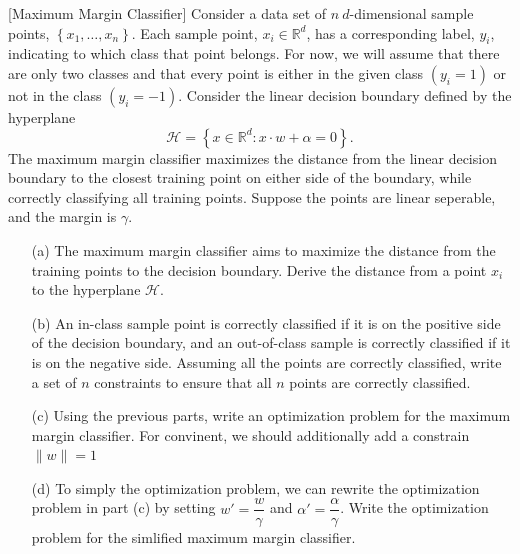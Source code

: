 \item {} [Maximum Margin Classifier]
Consider a data set of $n\ d$-dimensional sample points, $\left\{x_1, \ldots, x_n\right\}$. Each sample point, $x_i \in \mathbb{R}^d$, has a corresponding label, $y_i$, indicating to which class that point belongs. For now, we will assume that there are only two classes and that every point is either in the given class $\left(y_i=1\right)$ or not in the class $\left(y_i=-1\right)$. Consider the linear decision boundary defined by the hyperplane
$$
\mathcal{H}=\left\{x \in \mathbb{R}^d: x \cdot w+\alpha=0\right\} .
$$
The maximum margin classifier maximizes the distance from the linear decision boundary to the closest training point on either side of the boundary, while correctly classifying all training points. Suppose the points are linear seperable, and the margin is $\gamma$.

\begin{itemize}
\item[(a)]The maximum margin classifier aims to maximize the distance from the training points to the decision boundary. Derive the distance from a point $x_i$ to the hyperplane $\mathcal{H}$. ~

\item[(b)] An in-class sample point is correctly classified if it is on the positive side of the decision boundary, and an out-of-class sample is correctly classified if it is on the negative side. Assuming all the points are correctly classified, write a set of $n$ constraints to ensure that all $n$ points are correctly classified. ~

\item[(c)] Using the previous parts, write an optimization problem for the maximum margin classifier. For convinent, we should additionally add a constrain $\|w\|=1$ ~

\item[(d)] To simply the optimization problem, we can rewrite the optimization problem in part (c) by setting $w'=\dfrac{w}{\gamma}$ and $\alpha'=\dfrac{\alpha}{\gamma}$. Write the optimization problem for the simlified maximum margin classifier. ~

\end{itemize}

\solution














\newpage